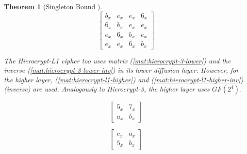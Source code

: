 \documentclass{report}
\newtheorem{theorem}{Theorem}{\bfseries}{\itshape}
\begin{document}
\begin{theorem}[Singleton Bound \cite{SloaneBook}]
\begin{equation}\label{mat:hierocrypt-3-higher-inv}
\begin{bmatrix}
b_x & e_x & e_x & 6_x\\
6_x & b_x & e_x & e_x\\
e_x & 6_x & b_x & e_x\\
e_x & e_x & 6_x & b_x
\end{bmatrix}
\end{equation}

The Hierocrypt-L1 cipher too uses matrix (\ref{mat:hierocrypt-3-lower}) and the inverse (\ref{mat:hierocrypt-3-lower-inv}) in its lower diffusion layer. However, for the higher layer, (\ref{mat:hierocrypt-l1-higher}) and (\ref{mat:hierocrypt-l1-higher-inv}) (inverse) are used. Analogously to Hierocrypt-3, the higher layer uses $GF(2^4)$.

\begin{equation}\label{mat:hierocrypt-l1-higher}
\begin{bmatrix}
5_x & 7_x\\
a_x & b_x
\end{bmatrix}
\end{equation}

\begin{equation}\label{mat:hierocrypt-l1-higher-inv}
\begin{bmatrix}
c_x & a_x\\
5_x & b_x
\end{bmatrix}
\end{equation}


\end{theorem}
\end{document}
